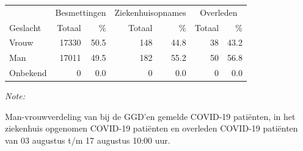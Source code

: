 \documentclass[
  english,
  man,floatsintext]{apa6}
\begin{document}
\begin{table}
\centering\begingroup\fontsize{11}{13}\selectfont

\begin{threeparttable}
\begin{tabular}{lrrrrrr}
\toprule
\multicolumn{1}{c}{ } & \multicolumn{2}{c}{Besmettingen} & \multicolumn{2}{c}{Ziekenhuisopnames} & \multicolumn{2}{c}{Overleden} \\
\cmidrule(l{3pt}r{3pt}){2-3} \cmidrule(l{3pt}r{3pt}){4-5} \cmidrule(l{3pt}r{3pt}){6-7}
Geslacht & Totaal & \% & Totaal & \% & Totaal & \%\\
\midrule
Vrouw & 17330 & 50.5 & 148 & 44.8 & 38 & 43.2\\
Man & 17011 & 49.5 & 182 & 55.2 & 50 & 56.8\\
Onbekend & 0 & 0.0 & 0 & 0.0 & 0 & 0.0\\
\bottomrule
\end{tabular}
\begin{tablenotes}
\item \textit{Note: } 
\item Man-vrouwverdeling van bij de GGD’en gemelde COVID-19 patiënten, in het ziekenhuis opgenomen COVID-19 patiënten en overleden COVID-19 patiënten van 03 augustus t/m 17 augustus 10:00 uur.
\end{tablenotes}
\end{threeparttable}
\endgroup{}
\end{table}
\newpage
\end{document}

